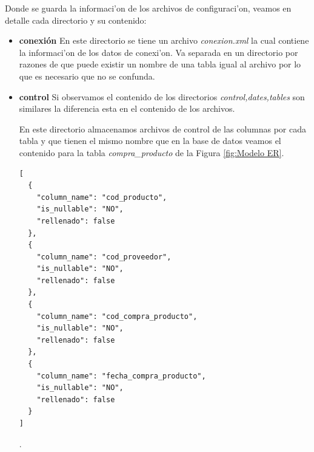 Donde se guarda la informaci'on de los archivos de configuraci'on, veamos en detalle cada directorio y su contenido:
\begin{itemize}
\item \textbf{conexi\'on} En este directorio se tiene un archivo \textit{conexion.xml} la cual contiene la informaci'on de los datos de conexi'on. Va separada en un directorio por razones de que puede existir un nombre de una tabla igual al archivo por lo que es necesario que no se confunda.
\item \textbf{control} Si observamos el contenido de los directorios \textit{control,dates,tables} son similares la diferencia esta en el contenido de los archivos.
 
En este directorio almacenamos archivos de control de las columnas por cada tabla y que tienen el mismo nombre que en la base de datos veamos el contenido para la tabla \textit{compra\_producto} de la Figura \ref{fig:Modelo ER}.
\lstset{language=java,breaklines=true}
\label{tablaCompraProductoArchivoControl}
\begin{lstlisting}
[
  {
    "column_name": "cod_producto",
    "is_nullable": "NO",
    "rellenado": false
  },
  {
    "column_name": "cod_proveedor",
    "is_nullable": "NO",
    "rellenado": false
  },
  {
    "column_name": "cod_compra_producto",
    "is_nullable": "NO",
    "rellenado": false
  },
  {
    "column_name": "fecha_compra_producto",
    "is_nullable": "NO",
    "rellenado": false
  }
]
\end{lstlisting}.
 

\end{itemize}
